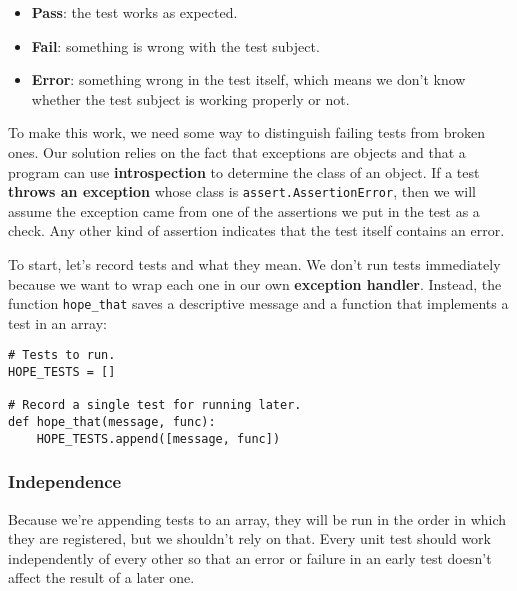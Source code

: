 \documentclass{scrbook}
\newcommand{\glossref}[1]{\textbf{#1}}
\begin{document}
\begin{itemize}

\item 

\glossref{Pass}:
    the test works as expected.



\item 

\glossref{Fail}:
    something is wrong with the test subject.



\item 

\glossref{Error}:
    something wrong in the test itself,
    which means we don't know whether the test subject is working properly or not.



\end{itemize}


To make this work,
we need some way to distinguish failing tests from broken ones.
Our solution relies on the fact that exceptions are objects
and that a program can use \glossref{introspection}
to determine the class of an object.
If a test \glossref{throws an exception} whose class is \texttt{assert.AssertionError},
then we will assume the exception came from
one of the assertions we put in the test as a check.
Any other kind of assertion indicates that the test itself contains an error.


To start,
let's record tests and what they mean.
We don't run tests immediately
because we want to wrap each one in our own \glossref{exception handler}.
Instead,
the function \texttt{hope\_that} saves a descriptive message and a function that implements a test
in an array:


\begin{lstlisting}[frame=single,frameround=tttt]
# Tests to run.
HOPE_TESTS = []

# Record a single test for running later.
def hope_that(message, func):
    HOPE_TESTS.append([message, func])
\end{lstlisting}


\begin{callout}


\subsubsection*{Independence}


Because we're appending tests to an array,
they will be run in the order in which they are registered,
but we shouldn't rely on that.
Every unit test should work independently of every other
so that an error or failure in an early test
doesn't affect the result of a later one.

\end{callout}
\end{document}
